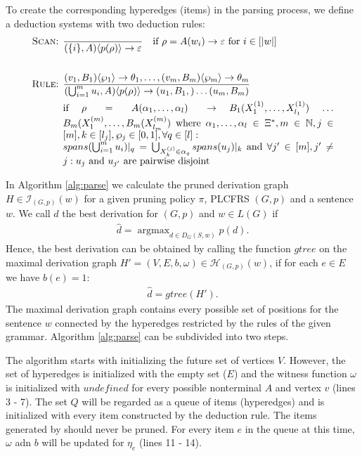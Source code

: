 \documentclass{tudscrartcl}
\theoremstyle{definition}
\DeclareMathOperator*{\argmax}{argmax}
\begin{document}
To create the corresponding hyperedges (items) in the parsing process, we define a deduction systems with two deduction rules:
\begin{align*}
	\text{\textproc{Scan}: }
	& \frac{}{(\{i\}, A)\langle p(\rho) \rangle \to \varepsilon} \quad
		\text{if }\rho = A(w_i) \to \varepsilon \text{ for } i \in [|w|]\\
		\vspace{20mm}\\
	\text{\textproc{Rule}: }
	& \frac{(v_1, B_1)\langle \wp_1 \rangle \to \theta_1, \ldots,
		(v_m, B_m)\langle \wp_m \rangle \to \theta_m}
		{(\bigcup_{i = 1}^m u_i, A)\langle p(\rho) \rangle \to
		(u_1, B_1,) \ldots (u_m, B_m)}\\
	& \parbox[t]{0.8\textwidth}{if $\rho = A(\alpha_1, \ldots, \alpha_l)
		\to$ $B_1(X_1^{(1)}, \ldots, X_{l_1}^{(1)})$
		$\ldots$ $B_m(X_1^{(m)}, \ldots, B_m(X_{l_m}^{(m)})$
		where $\alpha_1, \ldots, \alpha_l \in \Xi^*, m \in \mathbb{N},
		j \in [m], k \in [l_j], \wp_j \in [0, 1], \forall q \in [l]:$\\
		$spans(\bigcup_{i=1}^m u_i)|_q = \bigcup_{X_k^{(j)} \in \alpha_q} spans(u_j)|_k$
		and $\forall j' \in [m], j' \neq j: u_j $ and $ u_{j'}$ are pairwise disjoint}
\end{align*}



In Algorithm \ref{alg:parse} we calculate the pruned derivation graph $H \in \mathcal{I}_{(G, p)}(w)$
for a given pruning policy $\pi$, PLCFRS $(G, p)$ and a sentence $w$.
We call $\hat{d}$ the best derivation for $(G, p)$ and $w \in L(G)$ if
\begin{align*}
	\hat{d} = \argmax_{d \in D_G(S, w)} p(d).
\end{align*}
Hence, the best derivation can be obtained by calling the function $gtree$ on the maximal derivation graph $H' = (V, E, b, \omega) \in \mathcal{H}_{(G, p)}(w)$, if for each $e \in E$ we have $b(e) = 1$:
\begin{align*}
	\hat{d} = gtree(H').
\end{align*}
The maximal derivation graph contains every possible set of positions for the sentence $w$ connected by the hyperedges restricted by the rules of the given grammar. Algorithm \ref{alg:parse} can be subdivided into two steps.

The algorithm starts with initializing the future set of vertices $V$.
However, the set of hyperedges is initialized with the empty set ($E$)
and the witness function $\omega$ is initialized with $undefined$ for every possible nonterminal $A$ and vertex $v$ (lines 3 - 7).
The set $Q$ will be regarded as a queue of items (hyperedges) and is initialized with every item constructed by the  deduction rule.
The items generated by  should never be pruned.
For every item $e$ in the queue at this time, $\omega$ adn $b$ will be updated for $\eta_e$ (lines 11 - 14).
\end{document}
